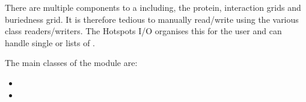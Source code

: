 \documentclass[letterpaper,10pt,english]{sphinxmanual}
\begin{document}
There are multiple components to a  including, the
protein, interaction grids and buriedness grid. It is therefore tedious to manually
read/write using the various class readers/writers. The Hotspots I/O organises this
for the user and can handle single  or lists of
.

The main classes of the  module are:
\begin{itemize}
\item {} 

\item {} 

\end{itemize}
\end{document}

